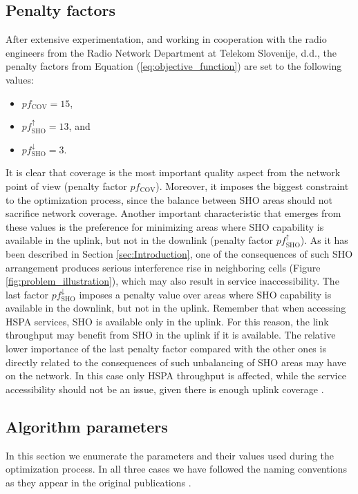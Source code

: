 \subsection{Penalty factors}

After extensive experimentation, and working in cooperation with the
radio engineers from the Radio Network Department at Telekom Slovenije,
d.d., the penalty factors from Equation (\ref{eq:objective_function})
are set to the following values:
\begin{itemize}
\item $pf_{\mathrm{COV}}=15$,
\item $pf_{\mathrm{SHO}}^{\uparrow}=13$, and
\item $pf_{\mathrm{SHO}}^{\downarrow}=3$.
\end{itemize}
It is clear that coverage is the most important quality aspect from
the network point of view (penalty factor $pf_{\mathrm{COV}}$). Moreover,
it imposes the biggest constraint to the optimization process, since
the balance between SHO areas should not sacrifice network coverage.
Another important characteristic that emerges from these values is
the preference for minimizing areas where SHO capability is available
in the uplink, but not in the downlink (penalty factor $pf_{\mathrm{SHO}}^{\uparrow}$).
As it has been described in Section \ref{sec:Introduction}, one of
the consequences of such SHO arrangement produces serious interference
rise in neighboring cells (Figure \ref{fig:problem_illustration}),
which may also result in service inaccessibility. The last factor
$pf_{\mathrm{SHO}}^{\downarrow}$ imposes a penalty value over areas
where SHO capability is available in the downlink, but not in the
uplink. Remember that when accessing HSPA services, SHO is available
only in the uplink. For this reason, the link throughput may benefit
from SHO in the uplink if it is available. The relative lower importance
of the last penalty factor compared with the other ones is directly
related to the consequences of such unbalancing of SHO areas may have
on the network. In this case only HSPA throughput is affected, while
the service accessibility should not be an issue, given there is enough
uplink coverage \cite{holma2006hsdpa}.


\subsection{Algorithm parameters}

In this section we enumerate the parameters and their values used
during the optimization process. In all three cases we have followed
the naming conventions as they appear in the original publications
\cite{Kirkpatrick_OptimizationBySimulatesAnnealing,korosec2010_DASA,storn1997_Differential_evolution}.


